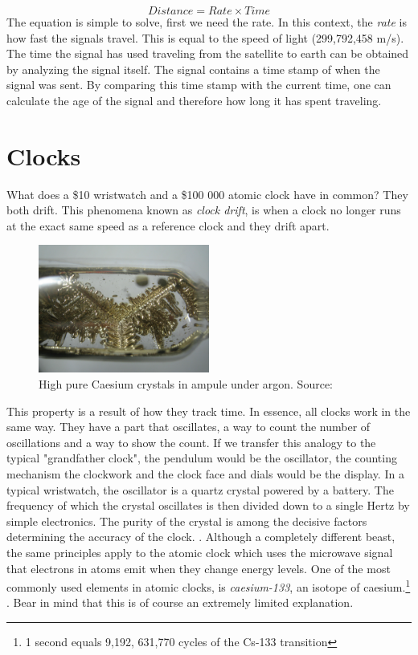 \documentclass[12pt,english,a4paper]{article}
\begin{document}
\begin{equation} Distance = Rate \times Time \end{equation} 
The equation is simple to solve, first we need the rate. In this context, the \textit{rate} is how fast the signals travel. This is equal to the speed of light (299,792,458 m/s). The time the signal has used traveling from the satellite to earth can be obtained by analyzing the signal itself. The signal contains a time stamp of when the signal was sent. By comparing this time stamp with the current time, one can calculate the age of the signal and therefore how long it has spent traveling. \cite{GPSGOVTE}  

\section{Clocks}
What does a \$10 wristwatch and a \$100 000 atomic clock have in common? They both drift. This phenomena known as \textit{clock drift}, is when a clock no longer runs at the exact same speed as a reference clock and they drift apart.
\begin{figure}
  \centering
  \includegraphics[width=0.50\textwidth]{cscrystals.jpg}
  \caption[Caesium campule]
   {High pure Caesium crystals in ampule under argon. Source: \cite{DENCES}}
\end{figure} 
This property is a result of how they track time. In essence, all clocks work in the same way. They have a part that oscillates, a way to count the number of oscillations and a way to show the count. If we transfer this analogy to the typical "grandfather clock", the pendulum would be the oscillator, the counting mechanism the clockwork and the clock face and dials would be the display. In a typical wristwatch, the oscillator is a quartz crystal powered by a battery. The frequency of which the crystal oscillates is then divided down to a single Hertz by simple electronics. The purity of the crystal is among the decisive factors determining the accuracy of the clock. \cite{CSMG}. 
Although a completely different beast, the same principles apply to the atomic clock which uses the microwave signal that electrons in atoms emit when they change energy levels. One of the most commonly used elements in atomic clocks, is \textit{caesium-133}, an isotope of caesium.\footnote{1 second equals 9,192, 631,770 cycles of the Cs-133 transition} \cite{HP}. Bear in mind that this is of course an extremely limited explanation.
\end{document}
